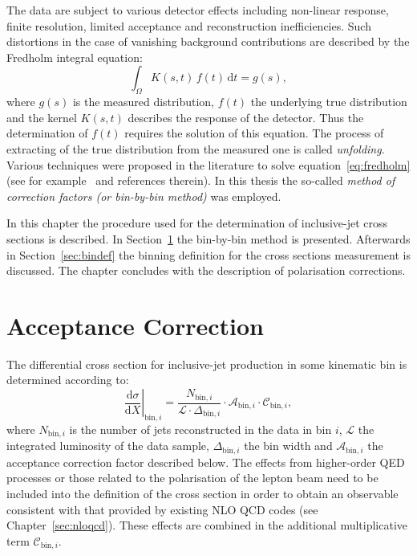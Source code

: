 The data are subject to various detector effects including non-linear response, finite resolution, limited acceptance and reconstruction inefficiencies. Such distortions in the case of vanishing background contributions are described by the Fredholm integral equation:
\begin{equation}
 \int_\Omega K\left(s,t\right)\,f\left(t\right)\,\mathrm{d}t = g\left(s\right),
 \label{eq:fredholm}
\end{equation}
where $g\left(s\right)$ is the measured distribution, $f\left(t\right)$ the underlying true distribution and the kernel $K\left(s,t\right)$ describes the response of the detector. Thus the determination of $f\left(t\right)$ requires the solution of this equation.
The process of extracting of the true distribution from the measured one is called \emph{unfolding}. Various techniques were proposed in the literature to solve equation~\ref{eq:fredholm} (see for example~\cite{statistics book page 187} and references therein). In this thesis the so-called \emph{method of correction factors (or bin-by-bin method)} was employed.

In this chapter the procedure used for the determination of inclusive-jet cross sections is described. In Section~\ref{sec:acccor} the bin-by-bin method is presented. Afterwards in Section~\ref{sec:bindef} the binning definition for the cross sections measurement is discussed. The chapter concludes with the description of polarisation corrections.

\section{Acceptance Correction}
\label{sec:acccor}
The differential cross section for inclusive-jet production in some kinematic bin is determined according to:
\begin{equation}
 \left.\frac{\mathrm{d}\sigma}{\mathrm{d}X}\right|_{\mathrm{bin},i} = \frac{N_{\mathrm{bin},i}}{\mathcal{L} \cdot \Delta_{\mathrm{bin},i}} \cdot \mathcal{A}_{\mathrm{bin},i} \cdot \mathcal{C}_{\mathrm{bin},i},
 \label{eq:csdef}
\end{equation}
where $N_{\mathrm{bin},i}$ is the number of jets reconstructed in the data in bin $i$, $\mathcal{L}$ the integrated luminosity of the data sample, $\Delta_{\mathrm{bin},i}$ the bin width and $\mathcal{A}_{\mathrm{bin},i}$ the acceptance correction factor described below. The effects from higher-order QED processes or those related to the polarisation of the lepton beam need to be included into the definition of the cross section in order to obtain an observable consistent with that provided by existing NLO QCD codes (see Chapter~\ref{sec:nloqcd}). These effects are combined in the additional multiplicative term $\mathcal{C}_{\mathrm{bin},i}$.

